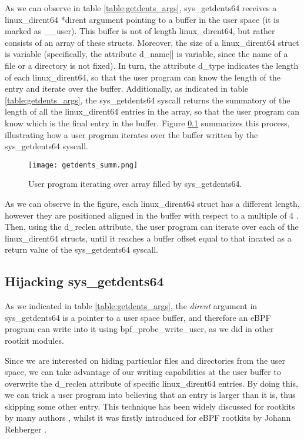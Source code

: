 As we can observe in table \ref{table:getdents_args}, sys\_getdents64 receives a linux\_dirent64 *dirent argument pointing to a buffer in the user space (it is marked as \_\_user). This buffer is not of length linux\_dirent64, but rather consists of an array of these structs. Moreover, the size of a linux\_dirent64 struct is variable (specifically, the attribute d\_name[] is variable, since the name of a file or a directory is not fixed). In turn, the attribute d\_type indicates the length of each linux\_dirent64, so that the user program can know the length of the entry and iterate over the buffer. Additionally, as indicated in table \ref{table:getdents_args}, the sys\_getdents64 syscall returns the summatory of the length of all the linux\_dirent64 entries in the array, so that the user program can know which is the final entry in the buffer. Figure \ref{} summarizes this process, illustrating how a user program iterates over the buffer written by the sys\_getdents64 syscall.

\begin{figure}[htbp]
	\centering
	\texttt{[image: getdents\_summ.png]}
	\caption{User program iterating over array filled by sys\_getdents64.}
	\label{fig:getdents_summ}
\end{figure}

As we can observe in the figure, each linux\_dirent64 struct has a different length, however they are positioned aligned in the buffer with respect to a multiple of 4 \cite{code_kerel_getdents_buffer_alignation}. Then, using the d\_reclen attribute, the user program can iterate over each of the linux\_dirent64 structs, until it reaches a buffer offset equal to that incated as a return value of the sys\_getdents64 syscall.

\subsection{Hijacking sys\_getdents64}
As we indicated in table \ref{table:getdents_args}, the \textit{dirent} argument in sys\_getdents64 is a pointer to a user space buffer, and therefore an eBPF program can write into it using bpf\_probe\_write\_user, as we did in other rootkit modules. 

Since we are interested on hiding particular files and directories from the user space, we can take advantage of our writing capabilities at the user buffer to overwrite the d\_reclen attribute of specific linux\_dirent64 entries. By doing this, we can trick a user program into believing that an entry is larger than it is, thus skipping some other entry. This technique has been widely discussed for rootkits by many authors \cite{xcellerator_getdents}, whilst it was firstly introduced for eBPF rootkits by Johann Rehberger \cite{embracethered_getdents}. 


